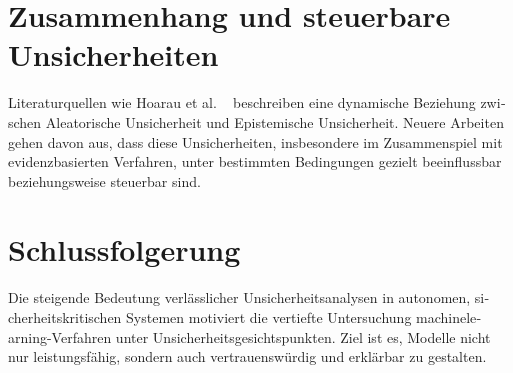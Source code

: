 \begin{otherlanguage}{ngerman}
\section{Zusammenhang und steuerbare Unsicherheiten}

Literaturquellen wie Hoarau et al. ~\parencite{ArthurHoarau2025} beschreiben eine dynamische Beziehung zwischen \gls{Aleatorische Unsicherheit} und \gls{Epistemische Unsicherheit}. Neuere Arbeiten gehen davon aus, dass diese Unsicherheiten, insbesondere im Zusammenspiel mit evidenzbasierten Verfahren, unter bestimmten Bedingungen gezielt beeinflussbar beziehungsweise steuerbar sind.

\section{Schlussfolgerung}

Die steigende Bedeutung verlässlicher Unsicherheitsanalysen in autonomen, sicherheitskritischen Systemen motiviert die vertiefte Untersuchung \gls{machinelearning}-Verfahren unter Unsicherheitsgesichtspunkten. Ziel ist es, Modelle nicht nur leistungsfähig, sondern auch vertrauenswürdig und erklärbar zu gestalten.
\end{otherlanguage}
